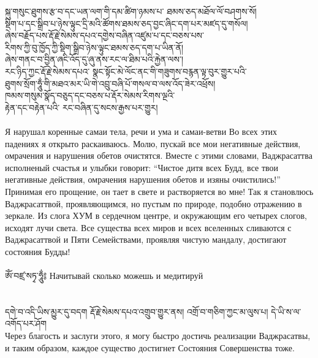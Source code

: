 \newpage
\ti
སྐུ་གསུང་ཐུགས་རྩ་བ་དང་ཡན་ལག་གི་དམ་ཚིག་ཉམས་པ་ ཐམས་ཅད་མཐོལ་ལོ་བཤགས་སོ། \\
སྡིག་པ་དང་སྒྲིབ་པ་ཉེས་ལྟུང་དྲི་མའི་ཚོགས་ཐམས་ཅད་བྱང་ཞིང་དག་པར་མཛད་དུ་གསོལ། \\
ཞེས་བརྗོད་པས་རྡོ་རྗེ་སེམས་དཔའ་དགྱེས་བཞིན་འཛུམ་པ་དང་བཅས་པས་ \\
རིགས་ཀྱི་བུ་ཁྱོད་ཀྱི་སྡིག་སྒྲིབ་ཉེས་ལྟུང་ཐམས་ཅད་དག་པ་ཡིན་ནོ། \\
ཞེས་གནང་བ་བྱིན་ཞངི་འོད་དུ་ཞུ་ནས་རང་ལ་ཐིམ་པའི་རྐྱེན་ལས་། \\
རང་ཉིད་ཀྱང་རྡོ་རྗེ་སེམས་དཔའ་ སྣང་སྟོང་མེ་ལོང་ནང་གི་གཟུགས་བརྙན་ལྟ་བུར་གྱུར་པའི་ \\
ཐུགས་སྲོག་ཧཱུྂ་གི་མཐའ་མར་ཡི་གེ་འབྲུ་བཞི་པོ་གསལ་བ་ལས་འོད་ཟེར་འཕྲོས། \\
ཁམས་གསུམ་སྣོད་བཅུད་དང་བཅས་པ་རྡོར་སེམས་རིགས་ལྔའི་\\
རྟེན་དང་བརྟེན་པའི་ རང་བཞིན་དུ་སངས་རྒྱས་པར་གྱུར།\\
\\
\ru
Я нарушал коренные самаи тела, речи и ума и самаи-ветви
Во всех этих падениях я открыто раскаиваюсь.
Молю, пускай все мои негативные действия, омрачения и нарушения обетов очистятся.
Вместе с этими словами, Ваджрасаттва исполненый счастья и улыбки говорит:
“Чистое дитя всех Будд, все твои негативные действия, омрачения
нарушения обетов и изяны очистились!”
Принимая его прощение, он тает в свете и раство\-ряется во мне!
Так я становлюсь Ваджрасаттвой,
проявляющи\-мся, но пустым по природе, подобно отражению в зеркале.
Из слога ХУМ в сердечном центре, и окружающим его четырех слогов, исходят лучи света.
Все существа всех миров и всех вселенных
сливаются с Ваджрасаттвой и Пяти Семействами, проявляя чистую мандалу,
достигают состояния Будды!\\
\\
\scriptsize
\ti
ཨོཾ་བཛྲ་སཏྭ་ཧཱུྂ༔ \ru Начитывай сколько можешь и медитируй\\
\\
\\
\ti
དགེ་བ་འདི་ཡིས་མྱུར་དུ་བདག རྡོ་རྗེ་སེམས་དཔའ་འགྲུབ་གྱུར་ནས། འགྲོ་བ་གཅིག་ཀྱང་མ་ལུས་པ། དེ་ཡི་ས་ལ་འགོད་པར་ཤོག\\
\ru
Через благость и заслуги этого, я могу быстро достичь реализации Ваджрасатвы,
и таким образом, каждое существо достигнет Состояния Совершенства тоже.
\normalsize
